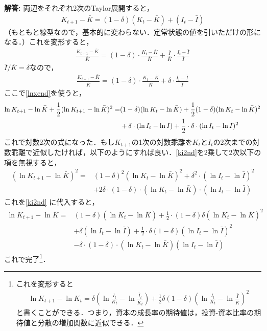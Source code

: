 \documentclass[a4paper,12pt,onecolumn,oneside,notitlepage,final]{article}
\begin{document}
\begin{enumerate}
{\bf 解答:} 両辺をそれぞれ2次のTaylor展開すると，
\begin{align*}
K_{t+1} - \bar K = (1-\delta) (K_t - \bar K) + (I_t - \bar I)
\end{align*}
（もともと線型なので，基本的に変わらない．定常状態の値を引いただけの形になる．）これを変形すると，
\begin{align*}
\frac{K_{t+1} - \bar K}{\bar K} = (1-\delta) \cdot \frac{K_t - \bar K}{\bar K} + \frac{\bar I}{\bar K} \cdot \frac{I_t - \bar I}{\bar I}
\end{align*}
$\bar I/ \bar K = \delta$なので，
\begin{align*}
\frac{K_{t+1} - \bar K}{\bar K} = (1-\delta) \cdot \frac{K_t - \bar K}{\bar K} + \delta \cdot \frac{I_t - \bar I}{\bar I}
\end{align*}
ここで\eqref{lnxend}を使うと，
\begin{align}
\ln K_{t+1} - \ln \bar K + \frac{1}{2} (\ln K_{t+1} - \ln \bar K)^2 = &(1-\delta) (\ln K_t - \ln \bar K) + \frac{1}{2} (1-\delta) (\ln K_t - \ln \bar K)^2 \notag \\
&+ \delta \cdot (\ln I_t - \ln \bar I) + \frac{1}{2}\cdot \delta \cdot (\ln I_t - \ln \bar I)^2 \label{ki2nd}
\end{align}
これで対数2次の式になった．もし$K_{t+1}$の1次の対数乖離を$K_t$と$I_t$の2次までの対数乖離で近似したければ，以下のようにすれば良い．\eqref{ki2nd}を2乗して2次以下の項を無視すると，
\begin{align*}
(\ln K_{t+1} - \ln \bar K)^2 = &(1-\delta)^2 (\ln K_t - \ln \bar K)^2 + \delta^2 \cdot (\ln I_t - \ln \bar I)^2 \\
&+ 2\delta\cdot (1-\delta) \cdot (\ln K_t - \ln \bar K) \cdot (\ln I_t - \ln \bar I)
\end{align*}
これを\eqref{ki2nd} に代入すると，
\begin{align*}
\ln K_{t+1} - \ln \bar K = &(1-\delta) (\ln K_t - \ln \bar K)  + \frac{1}{2}\cdot (1-\delta) \delta (\ln K_t - \ln \bar K)^2 \\
& + \delta (\ln I_t - \ln \bar I) + \frac{1}{2}\cdot \delta \left(1-\delta\right) (\ln I_t - \ln \bar I)^2 \\
&-\delta \cdot (1-\delta) \cdot (\ln K_t - \ln \bar K) (\ln I_t - \ln \bar I)
\end{align*}
これで完了\footnote{これを変形すると
\begin{align*}
\ln K_{t+1} - \ln K_t = \delta \left(\ln \frac{I_t}{K_t} - \ln \frac{\bar I_t}{\bar K_t}\right) + \frac{1}{2}\delta (1-\delta) \left(\ln \frac{I_t}{K_t} - \ln \frac{\bar I}{\bar K}\right)^2 
\end{align*}
と書くことができる．つまり，資本の成長率の期待値は，投資-資本比率の期待値と分散の増加関数に近似できる．}．
\end{enumerate}
\end{document}
